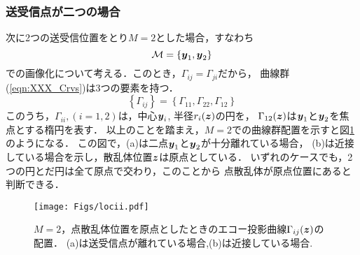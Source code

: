 \subsubsection{送受信点が二つの場合}
次に2つの送受信位置をとり$M=2$とした場合，すなわち
\begin{equation}
	{\cal M} =\left\{ 
		\mbox{\boldmath $y$}_1, \mbox{\boldmath $y$}_2
	\right\}
	\label{eqn:XXX_M2}
\end{equation}
での画像化について考える．このとき，$\Gamma_{ij}=\Gamma_{ji}$だから，
曲線群(\ref{eqn:XXX_Crvs})は3つの要素を持つ．
\begin{equation}
	\left\{ \Gamma_{ij} \right\} = \left\{ \Gamma_{11},\Gamma_{22}, \Gamma_{12}\right\}
	\label{eqn:}
\end{equation}
このうち，$\Gamma_{ii}, (i=1,2)$は，中心$\mbox{\boldmath $y$}_i$, 半径$r_i(\mbox{\boldmath $z$})$の円を，
$\Gamma_{12}(\mbox{\boldmath $z$})$は$\mbox{\boldmath $y$}_1$と$\mbox{\boldmath $y$}_2$を焦点とする楕円を表す．
以上のことを踏まえ，$M=2$での曲線群配置を示すと図\ref{fig:XXX_locii}のようになる．
この図で，(a)は二点$\mbox{\boldmath $y$}_1$と$\mbox{\boldmath $y$}_2$が十分離れている場合，
(b)は近接している場合を示し，散乱体位置$\mbox{\boldmath $z$}$は原点としている．
いずれのケースでも，2つの円とだ円は全て原点で交わり，このことから
点散乱体が原点位置にあると判断できる．
\begin{figure}[h]
	\begin{center}
	\texttt{[image: Figs/locii.pdf]} 
	\end{center}
	\caption{
	$M=2$，点散乱体位置を原点としたときのエコー投影曲線$\Gamma_{ij}(\mbox{\boldmath $z$})$の配置．
	(a)は送受信点が離れている場合,(b)は近接している場合.} 
	\label{fig:XXX_locii}
\end{figure}

